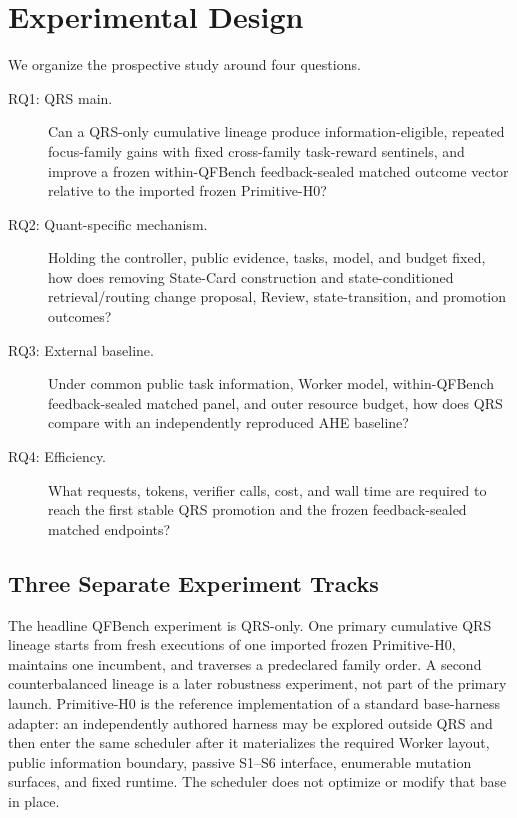 \section{Experimental Design}

We organize the prospective study around four questions.

\begin{description}
    \item[RQ1: QRS main.] Can a QRS-only cumulative lineage produce
    information-eligible, repeated focus-family gains with fixed cross-family
    task-reward sentinels, and improve a frozen within-QFBench feedback-sealed
    matched outcome vector relative
    to the imported frozen Primitive-H0?
    \item[RQ2: Quant-specific mechanism.] Holding the controller, public
    evidence, tasks, model, and budget fixed, how does removing State-Card
    construction and state-conditioned retrieval/routing change proposal,
    Review, state-transition, and promotion outcomes?
    \item[RQ3: External baseline.] Under common public task information,
    Worker model, within-QFBench feedback-sealed matched panel, and outer
    resource budget, how does QRS compare with an independently reproduced AHE
    baseline?
    \item[RQ4: Efficiency.] What requests, tokens, verifier calls, cost, and
    wall time are required to reach the first stable QRS promotion and the
    frozen feedback-sealed matched endpoints?
\end{description}

\subsection{Three Separate Experiment Tracks}

The headline QFBench experiment is QRS-only. One primary cumulative QRS
lineage starts from fresh executions of one imported frozen Primitive-H0,
maintains one incumbent, and traverses a predeclared family order. A second
counterbalanced lineage is a later robustness experiment, not part of the
primary launch.
Primitive-H0 is the reference implementation of a standard base-harness
adapter: an independently authored harness may be explored outside QRS and then
enter the same scheduler after it materializes the required Worker layout,
public information boundary, passive S1--S6 interface, enumerable mutation
surfaces, and fixed runtime. The scheduler does not optimize or modify that
base in place.

